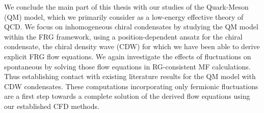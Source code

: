 We conclude the main part of this thesis with our studies of the \fourDimensional{} Quark-Meson (QM) model, which we primarily consider as a low-energy effective theory of QCD.
We focus on inhomogeneous chiral condensates by studying the QM model within the FRG framework, using a position-dependent ansatz for the chiral condensate, \viz{} the chiral density wave (CDW) for which we have been able to derive explicit FRG flow equations.
We again investigate the effects of fluctuations on spontaneous \csb{} by solving those flow equations in RG-consistent MF calculations.
Thus establishing contact with existing literature results for the QM model with CDW condensates.
These computations \dash{} incorporating only fermionic fluctuations \dash{} are a first step towards a complete solution of the derived flow equations using our established CFD methods.